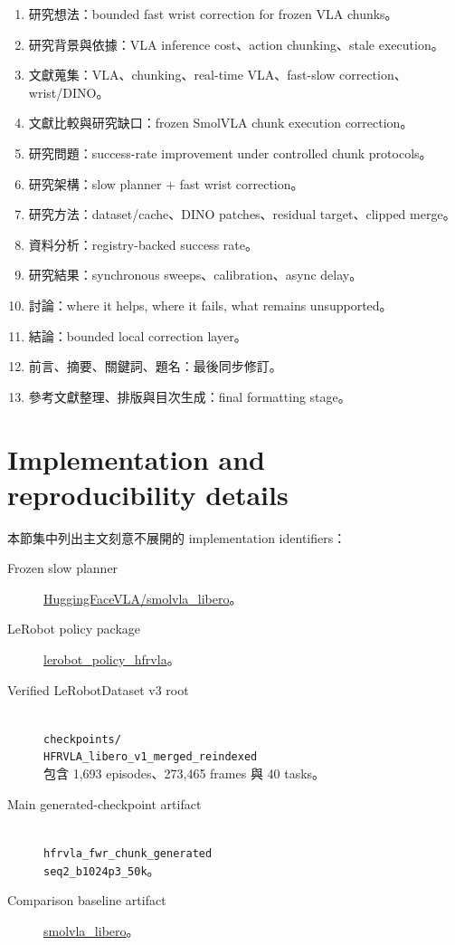 \begin{enumerate}
  \item 研究想法：bounded fast wrist correction for frozen VLA chunks。
  \item 研究背景與依據：VLA inference cost、action chunking、stale execution。
  \item 文獻蒐集：VLA、chunking、real-time VLA、fast-slow correction、wrist/DINO。
  \item 文獻比較與研究缺口：frozen SmolVLA chunk execution correction。
  \item 研究問題：success-rate improvement under controlled chunk protocols。
  \item 研究架構：slow planner + fast wrist correction。
  \item 研究方法：dataset/cache、DINO patches、residual target、clipped merge。
  \item 資料分析：registry-backed success rate。
  \item 研究結果：synchronous sweeps、calibration、async delay。
  \item 討論：where it helps, where it fails, what remains unsupported。
  \item 結論：bounded local correction layer。
  \item 前言、摘要、關鍵詞、題名：最後同步修訂。
  \item 參考文獻整理、排版與目次生成：final formatting stage。
\end{enumerate}

\section{Implementation and reproducibility details}
\label{app:thesis-implementation-reproducibility}

本節集中列出主文刻意不展開的 implementation identifiers：

\begin{description}
  \item[Frozen slow planner] \url{HuggingFaceVLA/smolvla_libero}。
  \item[LeRobot policy package] \url{lerobot_policy_hfrvla}。
  \item[Verified LeRobotDataset v3 root] \leavevmode\\
  \texttt{checkpoints/}\\
  \texttt{HFRVLA\_libero\_v1\_merged\_reindexed}\\
  包含 1,693 episodes、273,465 frames 與 40 tasks。
  \item[Main generated-checkpoint artifact] \leavevmode\\
  \texttt{hfrvla\_fwr\_chunk\_generated}\\
  \texttt{seq2\_b1024p3\_50k}。
  \item[Comparison baseline artifact] \url{smolvla_libero}。
\end{description}

